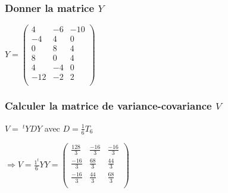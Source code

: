 \documentclass[a4paper, 12pt]{article}
\begin{document}
\subsubsection{Donner la matrice $Y$}
\begin{center}
$Y = 
\begin{pmatrix}
4 & -6 & -10 \\
-4 & 4 & 0 \\
0 & 8 & 4 \\
8 & 0 & 4 \\
4 & -4 & 0 \\
-12 & -2 & 2 \\
\end{pmatrix}
$ \\
\end{center}


\subsubsection{Calculer la matrice de variance-covariance $V$}
$V = \ ^t YDY$ avec $D = \frac{1}{6} T_6$ \\
\begin{center}
{\Large
$\Rightarrow V = \frac{1^t}{6} YY = 
\begin{pmatrix}
\frac{128}{3} & \frac{-16}{3} & \frac{-16}{3} \\
\frac{-16}{3} & \frac{68}{3} & \frac{44}{3} \\
\frac{-16}{3} & \frac{44}{3} & \frac{68}{3} \\
\end{pmatrix}
$} \\
\end{center}
\end{document}
